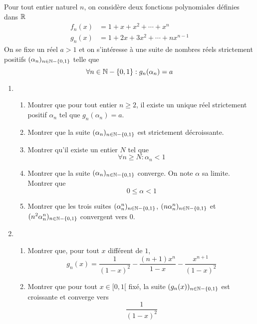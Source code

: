 Pour tout entier naturel $n$, on considère  deux fonctions polynomiales définies dans $\mathbb{R}$
\begin{align*}
 f_n(x) &= 1 +x +x^2 +\cdots +x^n \\
 g_n(x) &= 1 + 2x +3x^2 +\cdots +nx^{n-1} 
\end{align*}
On se fixe un réel $a>1$ et on s'intéresse à une suite de nombres réels strictement positifs $(\alpha_n)_{n\in \mathbb{N}-\{0,1\}}$ telle que
\begin{displaymath}
 \forall n\in \mathbb{N}-\{0,1\} : g_n(\alpha_n) = a
\end{displaymath}
\begin{enumerate}
 \item \begin{enumerate}
 \item Montrer que pour tout entier $n\geq 2$, il existe un unique réel strictement positif $\alpha_n$ tel que $g_n(\alpha_n) = a$.
\item Montrer que la suite $(\alpha_n)_{n\in \mathbb{N}-\{0,1\}}$ est strictement décroissante.
\item Montrer qu'il existe un entier $N$ tel que 
\begin{displaymath}
 \forall n\geq N : \alpha_n < 1
\end{displaymath}
\item Montrer que la suite $(\alpha_n)_{n\in \mathbb{N}-\{0,1\}}$ converge. On note $\alpha$ sa limite. Montrer que
\begin{displaymath}
 0\leq \alpha <1
\end{displaymath}
\item Montrer que les trois suites $(\alpha_n^n)_{n\in \mathbb{N}-\{0,1\}}$,  $(n\alpha_n^n)_{n\in \mathbb{N}-\{0,1\}}$ et  $(n^2\alpha_n^n)_{n\in \mathbb{N}-\{0,1\}}$ convergent vers $0$. 
\end{enumerate}
\item \begin{enumerate}
\item Montrer que, pour tout $x$ différent de $1$,
\begin{displaymath}
 g_n(x) = \dfrac{1}{(1-x)^2} -\dfrac{(n+1)x^n}{1-x} - \dfrac{x^{n+1}}{(1-x)^2}
\end{displaymath}
\item Montrer que pour tout $x\in [0,1[$ fixé, la suite $(g_n(x))_{n\in \mathbb{N}-\{0,1\}}$ est croissante et converge vers
\begin{displaymath}
 \dfrac{1}{(1-x)^2}
\end{displaymath}
\end{enumerate}

\end{enumerate}

